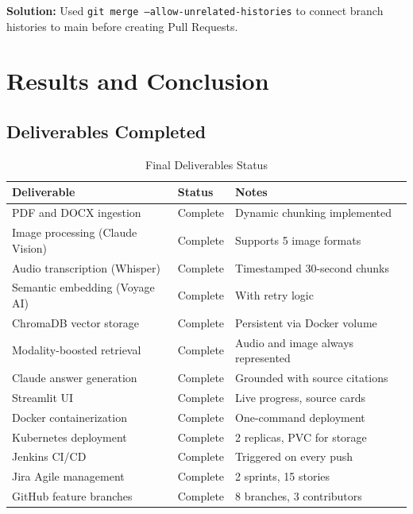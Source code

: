 \documentclass[12pt,a4paper]{report}
\begin{document}
\textbf{Solution:} Used \texttt{git merge --allow-unrelated-histories} to connect branch histories to main before creating Pull Requests.

\chapter{Results and Conclusion}

\section{Deliverables Completed}

\begin{table}[H]
\centering
\caption{Final Deliverables Status}
\begin{tabular}{p{6cm}p{2.5cm}p{4.5cm}}
\toprule
\textbf{Deliverable} & \textbf{Status} & \textbf{Notes} \\
\midrule
PDF and DOCX ingestion & Complete & Dynamic chunking implemented \\
Image processing (Claude Vision) & Complete & Supports 5 image formats \\
Audio transcription (Whisper) & Complete & Timestamped 30-second chunks \\
Semantic embedding (Voyage AI) & Complete & With retry logic \\
ChromaDB vector storage & Complete & Persistent via Docker volume \\
Modality-boosted retrieval & Complete & Audio and image always represented \\
Claude answer generation & Complete & Grounded with source citations \\
Streamlit UI & Complete & Live progress, source cards \\
Docker containerization & Complete & One-command deployment \\
Kubernetes deployment & Complete & 2 replicas, PVC for storage \\
Jenkins CI/CD & Complete & Triggered on every push \\
Jira Agile management & Complete & 2 sprints, 15 stories \\
GitHub feature branches & Complete & 8 branches, 3 contributors \\
\bottomrule
\end{tabular}
\end{table}
\end{document}
